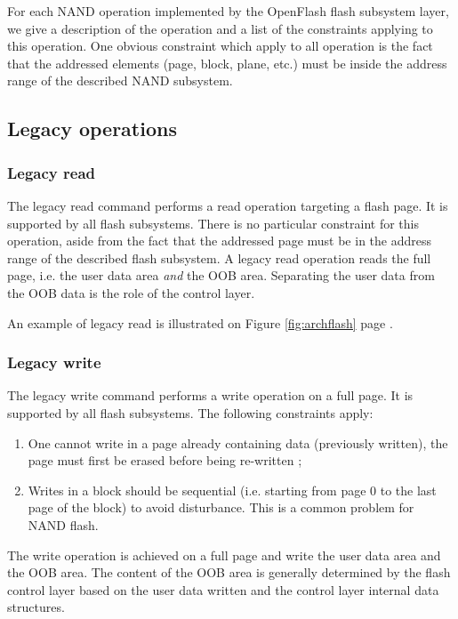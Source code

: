 For each NAND operation implemented by the OpenFlash flash subsystem layer, we give a description of the operation and a list of the constraints applying to this operation. One obvious constraint which apply to all operation is the fact that the addressed elements (page, block, plane, etc.) must be inside the address range of the described NAND subsystem.

\subsection{Legacy operations}

\subsubsection{Legacy read}
The legacy read command performs a read operation targeting a flash page. It is supported by all flash subsystems. There is no particular constraint for this operation, aside from the fact that the addressed page must be in the address range of the described flash subsystem. A legacy read operation reads the full page, i.e. the user data area \emph{and} the OOB area. Separating the user data from the OOB data is the role of the control layer.

An example of legacy read is illustrated on Figure \ref{fig:archflash} page \pageref{fig:archflash}.

\subsubsection{Legacy write}
The legacy write command performs a write operation on a full page. It is supported by all flash subsystems. The following constraints apply:

\begin{enumerate}
  \item One cannot write in a page already containing data (previously written), the page must first be erased before being re-written ;
  \item Writes in a block should be sequential (i.e. starting from page 0 to the last page of the block) to avoid disturbance. This is a common problem for NAND flash.
\end{enumerate}

The write operation is achieved on a full page and write the user data area and the OOB area. The content of the OOB area is generally determined by the flash control layer based on the user data written and the control layer internal data structures.

